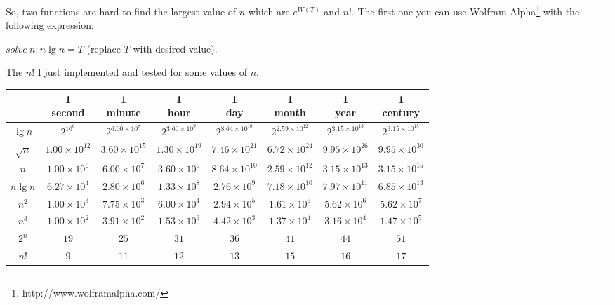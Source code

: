 \documentclass[11pt, oneside]{article}          %
\begin{document}
So, two functions are hard to find the largest value of $n$ which are $e^{W(T)}$ and $n!$. The first one you can use
Wolfram Alpha\footnote{http://www.wolframalpha.com/} with the following expression:

$solve\ n: n \lg n = T$ (replace $T$ with desired value).

The $n!$ I just implemented and tested for some values of $n$.

\begin{center}
  \begin{tabular}{ *{8}{c|} }
    & \shortstack{1 \\ second} & \shortstack{1 \\ minute} & \shortstack{1 \\ hour}%
      & \shortstack{1 \\ day} & \shortstack{1 \\ month} & \shortstack{1 \\ year}%
      & \shortstack{1 \\ century} \\ \hline

      $\lg n$   & $2^{10^6}$             & $2^{6.00 \times 10^7}$ & $2^{3.60 \times 10^9}$ & $2^{8.64 \times 10^{10}}$ & $2^{2.59 \times 10^{12}}$ & $2^{3.15 \times 10^{13}}$ & $2^{3.15 \times 10^{15}}$ \\
      $\sqrt n$ & $1.00 \times 10^{12}$  & $3.60 \times 10^{15}$  & $1.30 \times 10^{19}$  & $7.46 \times 10^{21}$  & $6.72 \times 10^{24}$     & $9.95 \times 10^{26}$     & $9.95 \times 10^{30}$ \\
      $n$       & $1.00 \times 10^6$     & $6.00 \times 10^7$     & $3.60 \times 10^9$     & $8.64 \times 10^{10}$  & $2.59 \times 10^{12}$     & $3.15 \times 10^{13}$     & $3.15 \times 10^{15}$ \\
      $n \lg n$ & $6.27 \times 10^4$     & $2.80 \times 10^6$     & $1.33 \times 10^8$     & $2.76 \times 10^9$     & $7.18 \times 10^{10}$     & $7.97 \times 10^{11}$     & $6.85 \times 10^{13}$ \\
      $n^2$     & $1.00 \times 10^3$     & $7.75 \times 10^3$     & $6.00 \times 10^4$     & $2.94 \times 10^5$     & $1.61 \times 10^6$        & $5.62 \times 10^6$        & $5.62 \times 10^7$ \\
      $n^3$     & $1.00 \times 10^2$     & $3.91 \times 10^2$     & $1.53 \times 10^3$     & $4.42 \times 10^3$     & $1.37 \times 10^4$        & $3.16 \times 10^4$        & $1.47 \times 10^5$ \\
      $2^n$     & $19$                   & $25$                   & $31$                   & $36$                   & $41$                      & $44$                      & $51$ \\
      $n!$      & $9$                    & $11$                   & $12$                   & $13$                   & $15$                      & $16$                      & $17$
    \end{tabular}
\end{center}
\end{document}

